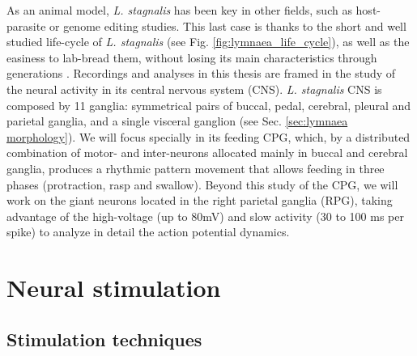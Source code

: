  As an animal model, \textit{L. stagnalis} has been key in other fields, such as host-parasite or genome editing studies. This last case is thanks to the short and well studied life-cycle of  \textit{L. stagnalis} (see Fig. \ref{fig:lymnaea_life_cycle}), as well as the easiness to lab-bread them, without losing its main characteristics through generations \parencite{noland_observations_1946}. Recordings and analyses in this thesis are framed in the study of the neural activity in its central nervous system (CNS). \textit{L. stagnalis} CNS is composed by 11 ganglia: symmetrical pairs of buccal, pedal, cerebral, pleural and parietal ganglia, and a single visceral ganglion (see Sec. \ref{sec:lymnaea morphology}). We will focus specially in its feeding CPG, which, by a distributed combination of motor- and inter-neurons allocated mainly in buccal and cerebral ganglia, produces a rhythmic pattern movement that allows feeding in three phases (protraction, rasp and swallow). Beyond this study of the CPG, we will work on the giant neurons located in the right parietal ganglia (RPG), taking advantage of the high-voltage (up to 80mV) and slow activity (30 to 100 ms per spike) to analyze in detail the action potential dynamics. 


\section{Neural stimulation}
\subsection{Stimulation techniques}

